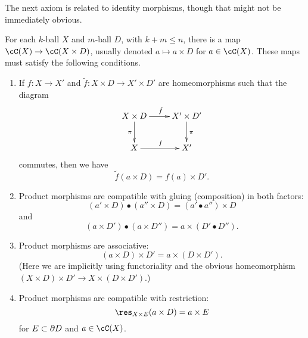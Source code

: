 The next axiom is related to identity morphisms, though that might not be immediately obvious.

\begin{axiom}
For each $k$-ball $X$ and $m$-ball $D$, with $k+m \le n$, there is a map $\cC(X)\to \cC(X\times D)$, 
usually denoted $a\mapsto a\times D$ for $a\in \cC(X)$.
These maps must satisfy the following conditions.
\begin{enumerate}
\item
If $f:X\to X'$ and $\tilde{f}:X\times D \to X'\times D'$ are homeomorphisms such that the diagram
\[ \xymatrix{
	X\times D \ar[r]^{\tilde{f}} \ar[d]_{\pi} & X'\times D' \ar[d]^{\pi} \\
	X \ar[r]^{f} & X'
} \]
commutes, then we have 
\[
	\tilde{f}(a\times D) = f(a)\times D' .
\]
\item
Product morphisms are compatible with gluing (composition) in both factors:
\[
	(a'\times D)\bullet(a''\times D) = (a'\bullet a'')\times D
\]
and
\[
	(a\times D')\bullet(a\times D'') = a\times (D'\bullet D'') .
\]
\item
Product morphisms are associative:
\[
	(a\times D)\times D' = a\times (D\times D') .
\]
(Here we are implicitly using functoriality and the obvious homeomorphism
$(X\times D)\times D' \to X\times(D\times D')$.)
\item
Product morphisms are compatible with restriction:
\[
	\res_{X\times E}(a\times D) = a\times E
\]
for $E\subset \partial D$ and $a\in \cC(X)$.
\end{enumerate}
\end{axiom}

